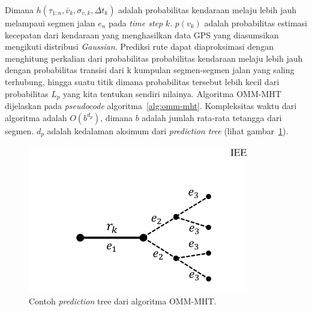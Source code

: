 Dimana $ h(\tau_{1:n},\overline{v}_k,\sigma_{v,k},\Delta t_k)$ adalah probabilitas kendaraan melaju lebih jauh melampaui segmen jalan $e_n$ pada \textit{time step } $k$. $p(v_k)$ adalah probabilitas estimasi kecepatan dari kendaraan yang menghasilkan data GPS yang diasumsikan mengikuti distribusi \textit{Gaussian}. Prediksi rute dapat diaproksimasi dengan menghitung perkalian dari probabilitas probabilitas kendaraan melaju lebih jauh dengan probabilitas transisi dari k kumpulan segmen-segmen jalan yang saling terhubung, hingga suatu titik dimana probabilitas tersebut lebih kecil dari probabilitas $L_p$ yang kita tentukan sendiri nilainya.  Algoritma OMM-MHT dijelaskan pada \textit{pseudocode} algoritma~\ref{alg:omm-mht}. Kompleksitas waktu dari algoritma adalah $O(b^{d_p})$, dimana $b$ adalah jumlah rata-rata tetangga dari segmen. $d_p$ adalah kedalaman aksimum dari \textit{prediction tree} (lihat gambar~\ref{fig:prediction-tree-omm}).


\begin{figure}[H]
    \centering
    \includegraphics[]{figures/prediction_tree_omm.png}
    \caption{Contoh \textit{prediction} tree dari algoritma OMM-MHT.}
    \label{fig:prediction-tree-omm}
\end{figure}




